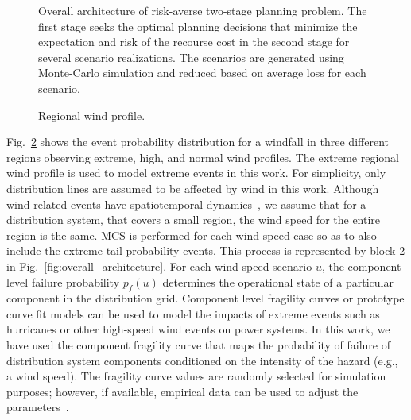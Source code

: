 \begin{figure}[t]
    \centering
    \caption{Overall architecture of risk-averse two-stage planning problem. The first stage seeks the optimal planning decisions that minimize the expectation and risk of the recourse cost in the second stage for several scenario realizations. The scenarios are generated using Monte-Carlo simulation and reduced based on average loss for each scenario.}
    \label{fig:overall_architecture_framework}
\end{figure} 

\begin{figure}[h]
    \centering
    \caption{Regional wind profile.}
    \label{fig:wind_profile}
\end{figure}

Fig.~\ref{fig:wind_profile} shows the event probability distribution for a windfall in three different regions observing extreme, high, and normal wind profiles. The extreme regional wind profile is used to model extreme events in this work. For simplicity, only distribution lines are assumed to be affected by wind in this work. Although wind-related events have spatiotemporal dynamics~\cite{poudyal2021spatiotemporal}, we assume that for a distribution system, that covers a small region, the wind speed for the entire region is the same. MCS is performed for each wind speed case so as to also include the extreme tail probability events. This process is represented by block 2 in Fig.~\ref{fig:overall_architecture}. For each wind speed scenario $u$, the component level failure probability $p_f(u)$ determines the operational state of a particular component in the distribution grid. Component level fragility curves \cite{panteli2017power} or prototype curve fit models \cite{powell1995real} can be  used to model the impacts of extreme events such as hurricanes or other high-speed wind events on power systems. In this work, we have used the component fragility curve that maps the probability of failure of distribution system components conditioned on the intensity of the hazard (e.g., a wind speed). The fragility curve values are randomly selected for simulation purposes; however, if available, empirical data can be used to adjust the parameters~\cite{7036086}.

